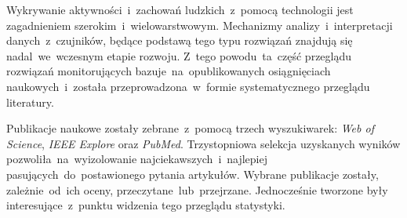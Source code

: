 Wykrywanie aktywności~i~zachowań ludzkich~z~pomocą technologii jest zagadnieniem szerokim~i~wielowarstwowym. Mechanizmy analizy~i~interpretacji danych~z~czujników, będące podstawą tego typu rozwiązań znajdują się nadal~we~wczesnym etapie rozwoju. Z~tego powodu~ta~część przeglądu rozwiązań monitorujących bazuje~na~opublikowanych osiągnięciach naukowych~i~została przeprowadzona~w~formie systematycznego przeglądu literatury. 

Publikacje naukowe zostały zebrane~z~pomocą trzech wyszukiwarek: \textit{Web of Science}, \textit{IEEE Explore} oraz \textit{PubMed}. Trzystopniowa selekcja uzyskanych wyników pozwoliła~na~wyizolowanie najciekawszych~i~najlepiej pasujących~do~postawionego pytania artykułów. Wybrane publikacje zostały, zależnie~od~ich oceny, przeczytane~lub~przejrzane. Jednocześnie tworzone były interesujące~z~punktu widzenia tego przeglądu statystyki. 
